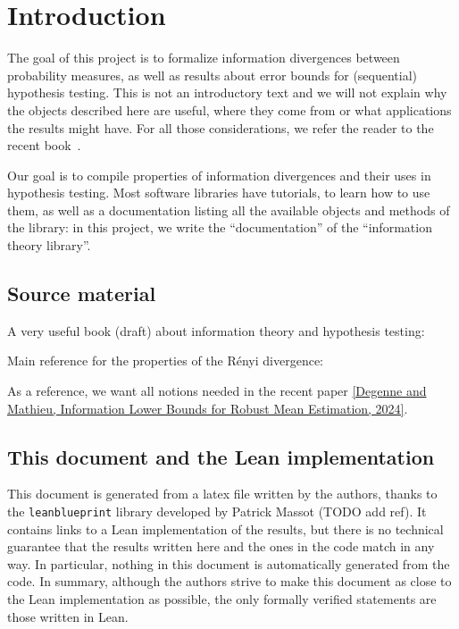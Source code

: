 \chapter*{Introduction}

The goal of this project is to formalize information divergences between probability measures, as well as results about error bounds for (sequential) hypothesis testing.
This is not an introductory text and we will not explain why the objects described here are useful, where they come from or what applications the results might have. For all those considerations, we refer the reader to the recent book~\cite{polyanskiy2024information}.

Our goal is to compile properties of information divergences and their uses in hypothesis testing. Most software libraries have tutorials, to learn how to use them, as well as a documentation listing all the available objects and methods of the library: in this project, we write the ``documentation'' of the ``information theory library''.


\section*{Source material}

A very useful book (draft) about information theory and hypothesis testing: \cite{polyanskiy2024information} 

Main reference for the properties of the Rényi divergence: \cite{van2014renyi}

As a reference, we want all notions needed in the recent paper \href{https://arxiv.org/abs/2403.01892}{[Degenne and Mathieu, Information Lower Bounds for Robust Mean Estimation, 2024]}. %

\section*{This document and the Lean implementation}

This document is generated from a latex file written by the authors, thanks to the \texttt{leanblueprint} library developed by Patrick Massot (TODO add ref). It contains links to a Lean implementation of the results, but there is no technical guarantee that the results written here and the ones in the code match in any way.
In particular, nothing in this document is automatically generated from the code.
In summary, although the authors strive to make this document as close to the Lean implementation as possible, the only formally verified statements are those written in Lean.

